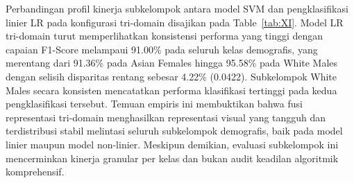 Perbandingan profil kinerja subkelompok antara model SVM dan pengklasifikasi linier LR pada konfigurasi tri-domain disajikan pada Table~\ref{tab:XI}. Model LR tri-domain turut memperlihatkan konsistensi performa yang tinggi dengan capaian F1-Score melampaui 91.00\% pada seluruh kelas demografis, yang merentang dari 91.36\% pada Asian Females hingga 95.58\% pada White Males dengan selisih disparitas rentang sebesar 4.22\% (0.0422). Subkelompok White Males secara konsisten mencatatkan performa klasifikasi tertinggi pada kedua pengklasifikasi tersebut. Temuan empiris ini membuktikan bahwa fusi representasi tri-domain menghasilkan representasi visual yang tangguh dan terdistribusi stabil melintasi seluruh subkelompok demografis, baik pada model linier maupun model non-linier. Meskipun demikian, evaluasi subkelompok ini mencerminkan kinerja granular per kelas dan bukan audit keadilan algoritmik komprehensif.
